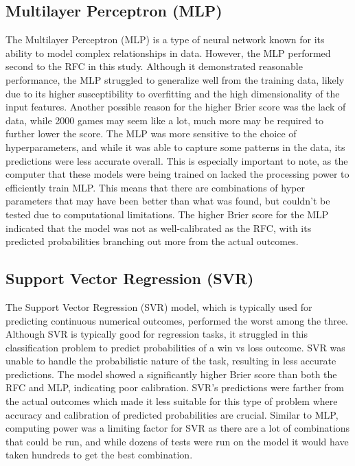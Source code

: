 \documentclass[10pt,twocolumn]{article}
\begin{document}
\subsection{Multilayer Perceptron (MLP)}
The Multilayer Perceptron (MLP) is a type of neural network known for its ability to model complex relationships in data. However, the MLP performed second to the RFC in this study. Although it demonstrated reasonable performance, the MLP struggled to generalize well from the training data, likely due to its higher susceptibility to overfitting and the high dimensionality of the input features. Another possible reason for the higher Brier score was the lack of data, while 2000 games may seem like a lot, much more may be required to further lower the score. The MLP was more sensitive to the choice of hyperparameters, and while it was able to capture some patterns in the data, its predictions were less accurate overall. This is especially important to note, as the computer that these models were being trained on lacked the processing power to efficiently train MLP. This means that there are combinations of hyper parameters that may have been better than what was found, but couldn’t be tested due to computational limitations. The higher Brier score for the MLP indicated that the model was not as well-calibrated as the RFC, with its predicted probabilities branching out more from the actual outcomes.

\subsection{Support Vector Regression (SVR)}
The Support Vector Regression (SVR) model, which is typically used for predicting continuous numerical outcomes, performed the worst among the three. Although SVR is typically good for regression tasks, it struggled in this classification problem to predict probabilities of a win vs loss outcome. SVR was unable to handle the probabilistic nature of the task, resulting in less accurate predictions. The model showed a significantly higher Brier score than both the RFC and MLP, indicating poor calibration. SVR's predictions were farther from the actual outcomes which made it less suitable for this type of problem where accuracy and calibration of predicted probabilities are crucial. Similar to MLP, computing power was a limiting factor for SVR as there are a lot of combinations that could be run, and while dozens of tests were run on the model it would have taken hundreds to get the best combination.
\end{document}
